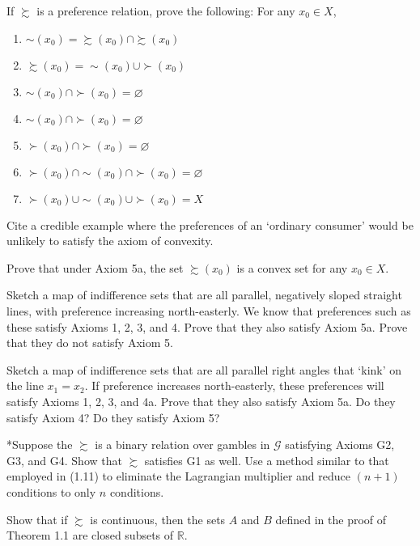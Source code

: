 \documentclass[b5paper]{memoir}
\def\chex{}
\def\printHintsAnswers{}
\def\printTerm{}
\begin{document}
\chex{If $\succsim$ is a preference relation, prove the following: For any $x_0 \in X$,
\begin{enumerate}[\quad(1)]
\item $\sim (x_0) = \succsim (x_0) \cap \succsim (x_0)$
\item $ \succsim(x_0) = \sim (x_0) \cup \succ (x_0)$
\item $\sim (x_0) \cap \succ (x_0) = \varnothing$
\item $ \sim (x_0) \cap \succ (x_0) = \varnothing$
\item $ \succ (x_0) \cap \succ(x_0) = \varnothing$
\item $\succ (x_0) \cap \sim (x_0) \cap \succ (x_0) = \varnothing$
\item $\succ (x_0) \cup \sim (x_0) \cup \succ (x_0) = X$
\end{enumerate}
}

\chex{Cite a credible example where the preferences of an ‘ordinary consumer’ would be unlikely to satisfy
the axiom of convexity.}

\chex{Prove that under Axiom 5a, the set $\succsim (x_0)$ is a convex set for any $x_0 \in X$.}

\chex{Sketch a map of indifference sets that are all parallel, negatively sloped straight
lines, with preference increasing north-easterly. We know that preferences such as these
satisfy Axioms 1, 2, 3, and 4. Prove that they also satisfy Axiom 5a. Prove that they do
not satisfy Axiom 5.}

\chex{Sketch a map of indifference sets that are all parallel right angles that ‘kink’ on
the line $x_1 = x_2$. If preference increases north-easterly, these preferences will
satisfy Axioms 1, 2, 3, and 4a. Prove that they also satisfy Axiom 5a. Do they satisfy
Axiom 4? Do they satisfy Axiom 5?}

\chex*{\label{chex:1-10}Suppose the $\succsim$ is a binary relation over gambles in
$\mathcal{G}$ satisfying Axioms G2, G3, and G4. Show that $\succsim$ satisfies G1 as
well.}%
{Use a method similar to that employed in (1.11) to eliminate the Lagrangian multiplier
and reduce $(n+1)$ conditions to only $n$ conditions.}

\chex{Show that if $\succsim$ is continuous, then the sets $A$ and $B$ defined in the
proof of Theorem 1.1 are closed subsets of $\mathbb{R}$.}

\backmatter

\printHintsAnswers

\printTerm
\end{document}
